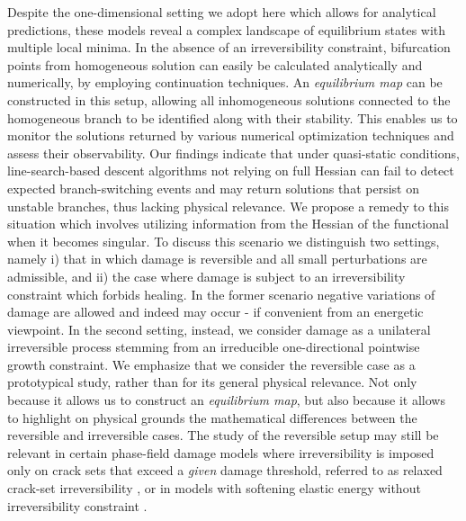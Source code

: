 Despite the one-dimensional setting we adopt here which allows for analytical predictions, these models reveal a complex landscape of equilibrium states with multiple local minima.
In the absence of an irreversibility constraint, bifurcation points from homogeneous solution can easily be calculated analytically and numerically, by employing continuation techniques.
An \emph{equilibrium map} can be constructed in this setup, allowing all  {inhomogeneous} solutions connected to the homogeneous branch to be identified along with their stability. This enables us to monitor the solutions returned by various numerical optimization techniques and assess their observability.
 Our findings indicate that under quasi-static conditions, line-search-based descent algorithms not relying on full Hessian can fail to detect expected branch-switching events and may return solutions that persist on unstable branches, thus lacking physical relevance. 
We propose a remedy to this situation which involves utilizing information from the Hessian of the functional when it becomes singular. 
To discuss this scenario we distinguish two settings, namely i) that in which damage is reversible and all small perturbations are admissible, and ii) the case where damage is subject to an irreversibility constraint which forbids healing. In the former scenario  negative variations of damage are allowed and indeed may occur - if convenient from an energetic viewpoint. In the second setting, instead, we consider damage as a unilateral irreversible process stemming from an irreducible one-directional pointwise growth constraint.
{We emphasize that we consider the reversible case as a prototypical study, rather than for its general physical relevance. Not only because it allows us to construct an \emph{equilibrium map}, but also because it allows to highlight on physical grounds the mathematical differences between the reversible and irreversible cases. The study of the reversible setup may still be relevant in certain phase-field damage models where irreversibility is imposed only on crack sets that exceed a \emph{given} damage threshold, referred to as relaxed crack-set irreversibility \cite{Bourdin2000-pc, Kumar2020-xz, De-Lorenzis2020-rz}, or  in models with softening elastic energy without irreversibility constraint \cite{Truskinovsky2010-st,Salman2019-kp,Salman2021-mn,Baggio2023-yo}.}


